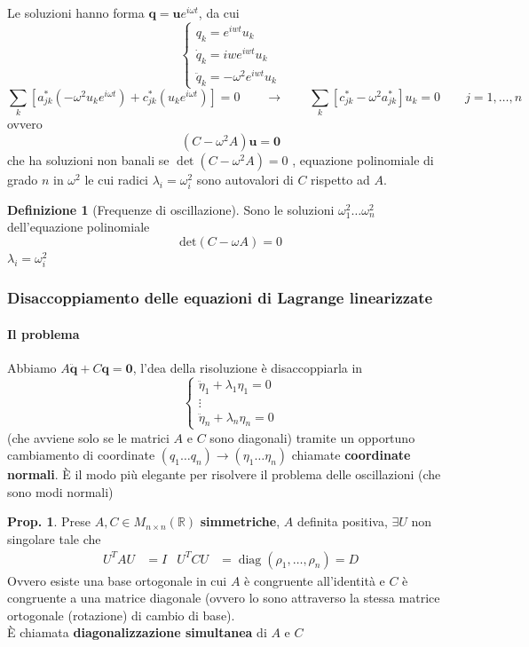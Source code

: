 \documentclass[a4paper,10pt]{article}
\theoremstyle{definition}
\DeclareMathOperator*{\diag}{diag}
\newcommand{\bv}{\boldsymbol} %
\theoremstyle{indentdefinition}
\newtheorem{defn}{Definizione}[section]
\theoremstyle{indenttheorem}
\newtheorem{prop}{Prop.}
\theoremstyle{myremark}
\theoremstyle{indentgeneral}
\begin{document}
Le soluzioni hanno forma $\bv{q}=\bv{u}e^{i\omega t}$, da cui
$$\begin{cases}
    q_k=e^{iwt}u_k \\
    \dot{q}_k=iwe^{iwt}u_k  \\
    \ddot{q}_k=-\omega^2e^{iwt}u_k
\end{cases}$$
\[
\sum_{k}\left[a_{jk}^{*}\left(-\omega^{2}u_{k}e^{i\omega t}\right)+c_{jk}^{*}\left(u_{k}e^{i\omega t}\right)\right]=0\qquad\longrightarrow\qquad\sum_{k}\left[c_{jk}^{*}-\omega^{2}a_{jk}^{*}\right]u_{k}=0\qquad j=1,\dots,n
\]
ovvero $$\left(C-\omega^{2}A\right)\bv{u}=\bv{0}$$
che ha soluzioni non banali se $\det\left(C-\omega^{2}A\right)=0$
, equazione polinomiale di grado $n$ in $\omega^{2}$ le cui radici
$\lambda_{i}=\omega_{i}^{2}$ sono autovalori di $C$ rispetto ad
$A$.

\begin{defn}[Frequenze di oscillazione]
    Sono le soluzioni $\omega_1^2\dots
\omega_n^2$ dell'equazione polinomiale $$\text{det}(C-\omega A)=0$$ $\lambda_{i}=\omega_{i}^{2}$
\end{defn}

\subsubsection{Disaccoppiamento delle equazioni di Lagrange linearizzate}
\paragraph{Il problema} Abbiamo $A\ddot{\bv{q}}+C\bv{q}  =\boldsymbol{0}$, l'dea della risoluzione è disaccoppiarla in 
$$\begin{cases}
    \ddot{\eta}_1+\lambda_1\eta_1=0 \\
    \vdots \\
    \ddot{\eta}_n+\lambda_n\eta_n=0 
\end{cases}$$
(che avviene solo se le matrici $A$ e $C$ sono diagonali) tramite un opportuno cambiamento di coordinate $(q_1\dots q_n)\to (\eta_1\dots\eta_n)$ chiamate \textbf{coordinate normali}. È il modo più elegante per risolvere il problema delle oscillazioni (che sono modi normali)
\begin{prop}
Prese $A,C\in M_{n\times n}(\mathbb{R})$ \textbf{simmetriche}, $A$ definita positiva, $\exists U$
non singolare tale che
\begin{align*}
U^{T}AU & =I & U^{T}CU & =\diag\left(\rho_{1},\dots,\rho_{n}\right)=D
\end{align*}
Ovvero esiste una base ortogonale in cui $A$ è congruente all'identità e $C$ è congruente a una matrice diagonale (ovvero lo sono attraverso la stessa matrice ortogonale (rotazione) di cambio di base). \\
È chiamata \textbf{diagonalizzazione simultanea} di $A$ e $C$
\end{prop}
\end{document}
